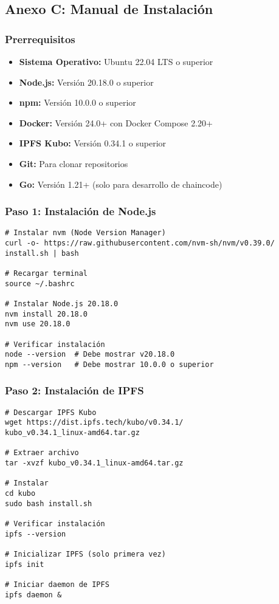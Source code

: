 \subsection{Anexo C: Manual de Instalación}

\subsubsection{Prerrequisitos}

\begin{itemize}
    \item \textbf{Sistema Operativo:} Ubuntu 22.04 LTS o superior
    \item \textbf{Node.js:} Versión 20.18.0 o superior
    \item \textbf{npm:} Versión 10.0.0 o superior
    \item \textbf{Docker:} Versión 24.0+ con Docker Compose 2.20+
    \item \textbf{IPFS Kubo:} Versión 0.34.1 o superior
    \item \textbf{Git:} Para clonar repositorios
    \item \textbf{Go:} Versión 1.21+ (solo para desarrollo de chaincode)
\end{itemize}

\subsubsection{Paso 1: Instalación de Node.js}

\begin{verbatim}
# Instalar nvm (Node Version Manager)
curl -o- https://raw.githubusercontent.com/nvm-sh/nvm/v0.39.0/
install.sh | bash

# Recargar terminal
source ~/.bashrc

# Instalar Node.js 20.18.0
nvm install 20.18.0
nvm use 20.18.0

# Verificar instalación
node --version  # Debe mostrar v20.18.0
npm --version   # Debe mostrar 10.0.0 o superior
\end{verbatim}

\subsubsection{Paso 2: Instalación de IPFS}

\begin{verbatim}
# Descargar IPFS Kubo
wget https://dist.ipfs.tech/kubo/v0.34.1/
kubo_v0.34.1_linux-amd64.tar.gz

# Extraer archivo
tar -xvzf kubo_v0.34.1_linux-amd64.tar.gz

# Instalar
cd kubo
sudo bash install.sh

# Verificar instalación
ipfs --version

# Inicializar IPFS (solo primera vez)
ipfs init

# Iniciar daemon de IPFS
ipfs daemon &
\end{verbatim}

